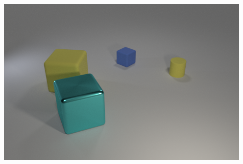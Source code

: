 \documentclass{article}
\begin{document}
\begin{table}[t!]
\centering
    \setlength\extrarowheight{-2pt}  %
		\centering
        \includegraphics[scale=0.25]{./CLEVR_val_004994.png}
	\hfill


\end{table}
\end{document}
